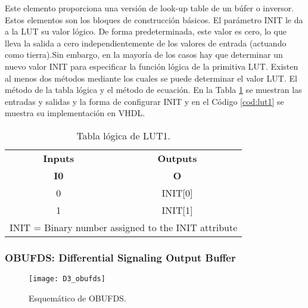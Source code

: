                Este elemento proporciona una versión de look-up table de un búfer o inversor. Estos elementos son los bloques de construcción básicos. El parámetro INIT le da a la LUT su valor lógico. De forma predeterminada, este valor es cero, lo que lleva la salida a cero independientemente de los valores de entrada (actuando como tierra).Sin embargo, en la mayoría de los casos hay que determinar un nuevo valor INIT para especificar la función lógica de la primitiva LUT. Existen al menos dos métodos mediante los cuales se puede determinar el valor LUT. El método de la tabla lógica y el método de ecuación. En la Tabla \ref{tab:lut1} se muestran las entradas y salidas y la forma de configurar INIT y en el Código \ref{cod:lut1} se muestra su implementación en VHDL.

                \begin{table}[htbp]
                    \centering
                    \caption{Tabla lógica de LUT1.}
                    \begin{tabular}{|cc|}
                        \hline
                        \multicolumn{1}{|c|}{\textbf{Inputs}} & \textbf{Outputs} \\ 
                        \multicolumn{1}{|c|}{\textbf{I0}} & \textbf{O} \\ 
                        \hline 
                        \multicolumn{1}{|c|}{0} & INIT[0] \\ \hline
                        \multicolumn{1}{|c|}{1} & INIT[1] \\ \hline
                        \multicolumn{2}{|c|}{INIT = Binary number assigned to the INIT attribute} \\ 
                        \hline
                    \end{tabular}
                    \label{tab:lut1}
                \end{table}	
	
                \vspace{0.4cm}
                

            \subsubsection{OBUFDS: Differential Signaling Output Buffer}

                \begin{figure}[hbtp]
                    \caption{Esquemático de OBUFDS.}
                    \centering
                    \texttt{[image: D3\_obufds]}
                    \label{fig:D3_obufds}
                \end{figure}	

